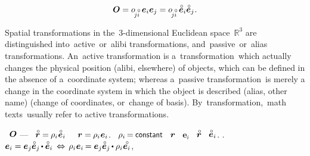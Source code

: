 \nopagebreak\vspace{-0.3em}\begin{equation*}
\rotationtensor = \cosinematrix{\!j\mathcircabove{i}} \hspace{.5ex} {\bm{e}}_{i} {\bm{e}}_{j} = \cosinematrix{\!j\mathcircabove{i}} \hspace{.5ex} \mathcircabove{\bm{e}}_{i} \mathcircabove{\bm{e}}_{j}
\hspace{.1ex} .
\end{equation*}

{\small
Spatial transformations in the 3-dimensional Euclidean space ${\mathbb{R}^{3}}$ are distinguished into active or alibi transformations, and passive or alias transformations.
An active transformation is a transformation which actually changes the physical position (alibi, elsewhere) of objects, which can be defined in the absence of a coordinate system; whereas a passive transformation is merely a change in the coordinate system in which the object is described (alias, other name) (change of coordinates, or change of basis). By transformation, math texts usually refer to active transformations.
\par}

~$\bm{O}$  \:--- ~${\initiallocationvector = \hspace{-0.1ex} \rho_i \hspace{.1ex} \mathcircabove{\bm{e}}_i}$ ~~${\bm{r} = \hspace{-0.1ex} \rho_i \hspace{.1ex} \bm{e}_i}$.
~${\rho_i \hspace{-0.2ex} = \hspace{-0.1ex} \constant}$ ~$\bm{r}$ ~${\bm{e}_i}$\ru{\:---}   ~${\initiallocationvector}$ ~${\mathcircabove{\bm{e}}_i}$.
   .
 ${\bm{e}_i = \bm{e}_j \mathcircabove{\bm{e}}_j \hspace{-0.15ex} \dotp \mathcircabove{\bm{e}}_i
\:\Leftrightarrow\,
\rho_i \hspace{.1ex} \bm{e}_i \hspace{-0.2ex} = \bm{e}_j \mathcircabove{\bm{e}}_j \hspace{-0.15ex} \dotp \rho_i \hspace{.1ex} \mathcircabove{\bm{e}_i}}$, 

